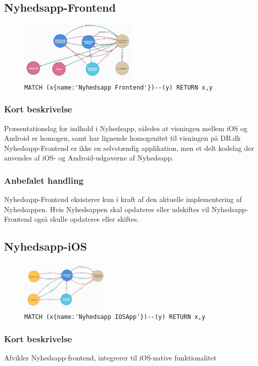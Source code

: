 \documentclass{article}
\begin{document}
\subsection{Nyhedsapp-Frontend}
\begin{figure}[H]
\includegraphics[width=160pt]{Nyhedsapp-Frontend.PNG}
\cprotect\caption{\verb|MATCH (x{name:'Nyhedsapp Frontend'})--(y) RETURN x,y|}
\end{figure}
\subsubsection*{Kort beskrivelse}
Præsentationslag for indhold i Nyhedsapp, således at visningen mellem iOS og Android er homogen, samt har lignende homogenitet til visningen på DR.dk
Nyhedsapp-Frontend er ikke en selvstændig applikation, men et delt kodelag der anvendes af iOS- og Android-udgaverne af Nyhedsapp. 
\subsubsection*{Anbefalet handling}
Nyhedsapp-Frontend eksisterer kun i kraft af den aktuelle implementering af Nyhedsappen. Hvis Nyhedsappen skal opdateres eller udskiftes vil Nyhedsapp-Frontend også skulle opdateres eller skiftes.


\subsection{Nyhedsapp-iOS}
\begin{figure}[H]
\includegraphics[width=120pt]{Nyhedsapp-IOS.PNG}
\cprotect\caption{\verb|MATCH (x{name:'Nyhedsapp IOSApp'})--(y) RETURN x,y|}
\end{figure}
\subsubsection*{Kort beskrivelse}
Afvikler Nyhedsapp-frontend, integrerer til iOS-native funktionalitet
\end{document}
